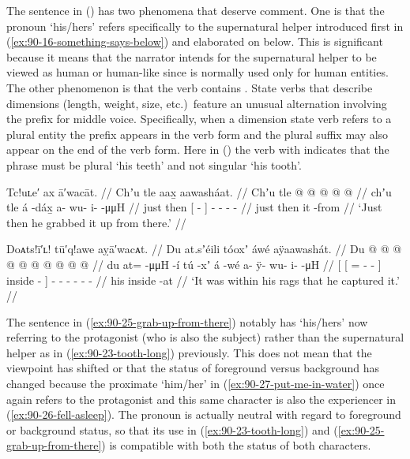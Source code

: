 The sentence in (\lastx) has two phenomena that deserve comment.
One is that the pronoun  ‘his/hers’ refers specifically to the supernatural helper introduced first in (\ref{ex:90-16-something-says-below}) and elaborated on below.
This is significant because it means that the narrator intends for the supernatural helper to be viewed as human or human-like since  is normally used only for human entities.
The other phenomenon is that the verb contains .
State verbs that describe dimensions (length, weight, size, etc.)\ feature an unusual alternation involving the  prefix for middle voice.
Specifically, when a dimension state verb refers to a plural entity the  prefix appears in the verb form and the plural suffix  may also appear on the end of the verb form.
Here in (\lastx) the verb with  indicates that the phrase  must be plural ‘his teeth’ and not singular ‘his tooth’.

\ex\label{ex:90-24-grab-up-from-there}%
%
\begingl
	\glpreamble	Tc!uʟe′ ax ā′wacāt. //
	\glpreamble	Chʼu tle aax̱ aawasháat. //
	\gla	Chʼu tle {}  @ {} {}
		 @ {} @ {} @ {} @ {} //
	\glb	chʼu tle {} á -dáx̱ {}
		a- wu- i-  -μμH //
	\glc	just then {}[  - {}]
		- - -  - //
	\gld	just then {} it -from {}
		 {} {} {} {} //
	\glft	‘Just then he grabbed it up from there.’
		//
\endgl
\xe

\ex\label{ex:90-25-grab-up-from-there}%
%
\begingl
	\glpreamble	Doᴀts!ī′ʟ! tū′q!awe aỵā′wacᴀt. //
	\glpreamble	Du at.sʼéili tóoxʼ áwé aÿaawashát. //
	\gla	{} Du {}  @ {} @ {} @ {} {}  @ {} {}
		 @ {}
		 @ {} @ {} @ {} @ {} @ {} //
	\glb	{} du {} at=  -μμH -í {} tú -xʼ {}
		á -wé
		a- ÿ- wu- i-  -μH //
	\glc	{}[  {}[ =  - - {}] inside - {}]
		 -
		- - - -  - //
	\gld	{} his {}  {} {} {} {} inside -at {}
		 {}
		 {} {} {} {} {} //
	\glft	‘It was within his rags that he captured it.’
		//
\endgl
\xe

The sentence in (\ref{ex:90-25-grab-up-from-there}) notably has  ‘his/hers’ now referring to the protagonist (who is also the subject) rather than the supernatural helper as in (\ref{ex:90-23-tooth-long}) previously.
This does not mean that the viewpoint has shifted or that the status of foreground versus background has changed because the proximate  ‘him/her’ in (\ref{ex:90-27-put-me-in-water}) once again refers to the protagonist and this same character is also the experiencer in (\ref{ex:90-26-fell-asleep}).
The  pronoun is actually neutral with regard to foreground or background status, so that its use in (\ref{ex:90-23-tooth-long}) and (\ref{ex:90-25-grab-up-from-there}) is compatible with both the status of both characters.

